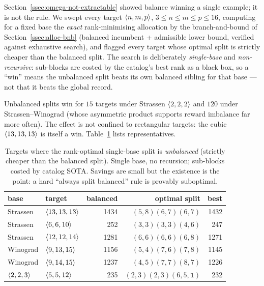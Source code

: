 Section~\ref{ssec:omega-not-extractable} showed balance winning a single
example; it is not the rule. We swept every target
\(\langle n, m, p \rangle\), \(3 \le n \le m \le p \le 16\), computing for a fixed
base the \emph{exact} rank-minimising allocation by the branch-and-bound of
Section~\ref{ssec:alloc-bnb} (balanced incumbent + admissible lower bound,
verified against exhaustive search),
and flagged every target whose optimal split is strictly cheaper than the
balanced split. The search is deliberately \emph{single-base} and
\emph{non-recursive}: sub-blocks are costed by the catalog's best rank as a
black box, so a ``win'' means the unbalanced split beats its own balanced
sibling for that base --- not that it beats the global record.

Unbalanced splits win for \(15\) targets under Strassen \(\langle 2, 2, 2 \rangle\)
and \(120\) under Strassen--Winograd (whose asymmetric product supports reward
imbalance far more often). The effect is not confined to rectangular targets:
the cubic \(\langle 13, 13, 13 \rangle\) is itself a win.
Table~\ref{tab:imbalance-wins} lists representatives.

\begin{table}[h]
\centering
\caption{Targets where the rank-optimal single-base split is \emph{unbalanced}
(strictly cheaper than the balanced split). Single base, no recursion;
sub-blocks costed by catalog SOTA. Savings are small but the existence is the
point: a hard ``always split balanced'' rule is provably suboptimal.}
\label{tab:imbalance-wins}
\begin{tabular}{llrrr}
\toprule
base & target & balanced & optimal split & best \\
\midrule
Strassen & \(\langle 13, 13, 13 \rangle\) & 1434 & \((5,8)(6,7)(6,7)\) & 1432 \\
Strassen & \(\langle 6, 6, 10 \rangle\)   & 252  & \((3,3)(3,3)(4,6)\) & 247 \\
Strassen & \(\langle 12, 12, 14 \rangle\) & 1281 & \((6,6)(6,6)(6,8)\) & 1271 \\
Winograd & \(\langle 9, 13, 15 \rangle\)  & 1156 & \((5,4)(7,6)(7,8)\) & 1145 \\
Winograd & \(\langle 9, 14, 15 \rangle\)  & 1237 & \((4,5)(7,7)(8,7)\) & 1226 \\
\(\langle 2, 2, 3 \rangle\) & \(\langle 5, 5, 12 \rangle\) & 235 & \((2,3)(2,3)(6,5,\mathbf{1})\) & 232 \\
\bottomrule
\end{tabular}
\end{table}

